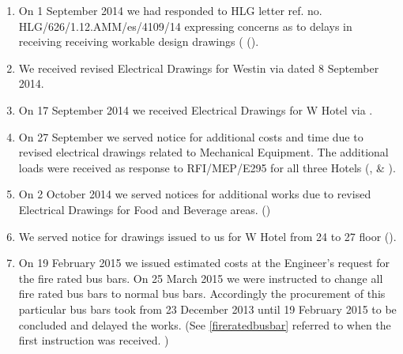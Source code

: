 \begin{enumerate}
\item On 1 September 2014 we had responded to HLG letter ref. no. HLG/626/1.12.AMM/es/4109/14 expressing concerns as to delays in receiving receiving workable design drawings ( ().

\item We received revised Electrical Drawings for Westin via  dated 8 September 2014.

\item On 17 September 2014 we received Electrical Drawings for W Hotel via . 

\item On 27 September we served notice for additional costs and time due to revised electrical drawings related to Mechanical Equipment. The additional loads were received as response to RFI/MEP/E295 for all three Hotels (, \& ).

\item On 2 October 2014 we served notices for additional works due to revised Electrical Drawings for Food and Beverage areas. () {}

\item We served notice for drawings issued to us for W Hotel from 24 to 27 floor ().

\item On 19 February 2015 we issued estimated costs at the Engineer's request for the fire rated bus bars. On 25 March 2015 we were instructed to change all fire rated bus bars to normal bus bars. Accordingly the procurement of this particular bus bars took from 23 December 2013 until 19 February 2015 to be concluded and delayed the works.  (See \ref{fireratedbusbar} referred to when the first instruction was received. )


\end{enumerate}